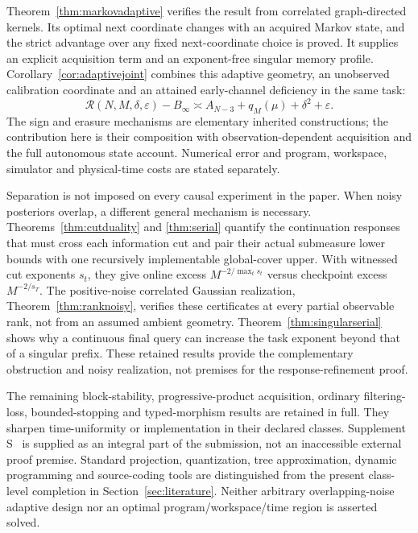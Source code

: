 Theorem~\ref{thm:markovadaptive} verifies the result from correlated graph-directed kernels. Its optimal next coordinate changes with an acquired Markov state, and the strict advantage over any fixed next-coordinate choice is proved. It supplies an explicit acquisition term and an exponent-free singular memory profile. Corollary~\ref{cor:adaptivejoint} combines this adaptive geometry, an unobserved calibration coordinate and an attained early-channel deficiency in the same task:
\[
 \mathcal R(N,M,\delta,\varepsilon)-B_\infty
 \asymp A_{N-3}+q_M(\mu)+\delta^2+\varepsilon.
\]
The sign and erasure mechanisms are elementary inherited constructions; the contribution here is their composition with observation-dependent acquisition and the full autonomous state account. Numerical error and program, workspace, simulator and physical-time costs are stated separately.

Separation is not imposed on every causal experiment in the paper. When noisy posteriors overlap, a different general mechanism is necessary. Theorems~\ref{thm:cutduality} and \ref{thm:serial} quantify the continuation responses that must cross each information cut and pair their actual submeasure lower bounds with one recursively implementable global-cover upper. With witnessed cut exponents $s_t$, they give online excess $M^{-2/\max_t s_t}$ versus checkpoint excess $M^{-2/s_T}$. The positive-noise correlated Gaussian realization, Theorem~\ref{thm:ranknoisy}, verifies these certificates at every partial observable rank, not from an assumed ambient geometry. Theorem~\ref{thm:singularserial} shows why a continuous final query can increase the task exponent beyond that of a singular prefix. These retained results provide the complementary obstruction and noisy realization, not premises for the response-refinement proof.

The remaining block-stability, progressive-product acquisition, ordinary filtering-loss, bounded-stopping and typed-morphism results are retained in full. They sharpen time-uniformity or implementation in their declared classes. Supplement S~\cite{companion} is supplied as an integral part of the submission, not an inaccessible external proof premise. Standard projection, quantization, tree approximation, dynamic programming and source-coding tools are distinguished from the present class-level completion in Section~\ref{sec:literature}. Neither arbitrary overlapping-noise adaptive design nor an optimal program/workspace/time region is asserted solved.

